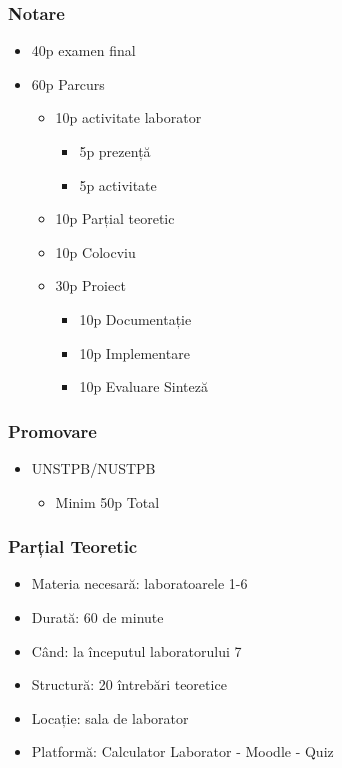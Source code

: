 
\begin{frame}
\frametitle{Notare}

\begin{itemize}
    \item 40p examen final
    \item 60p Parcurs
    \begin{itemize}
        \item 10p activitate laborator
        \begin{itemize}
            \item 5p prezență
            \item 5p activitate
        \end{itemize}
        \item 10p Parțial teoretic
        \item 10p Colocviu
        \item 30p Proiect
        \begin{itemize}
            \item 10p Documentație
            \item 10p Implementare
            \item 10p Evaluare Sinteză
        \end{itemize}
    \end{itemize}
\end{itemize}
\end{frame}

\begin{frame}
\frametitle{Promovare}
    
\begin{itemize}
    \item UNSTPB/NUSTPB
    \begin{itemize}
        \item Minim 50p Total
    \end{itemize}
\end{itemize}
\end{frame}

\begin{frame}
\frametitle{Parțial Teoretic}

\begin{itemize}
    \item Materia necesară: laboratoarele 1-6
    \item Durată: 60 de minute
    \item Când: la începutul laboratorului 7
    \item Structură: 20 întrebări teoretice
    \item Locație: sala de laborator
    \item Platformă: Calculator Laborator - Moodle - Quiz
\end{itemize}
\end{frame}

